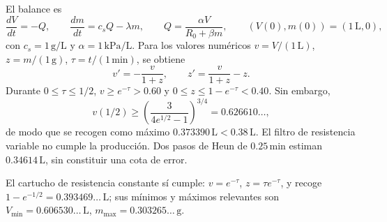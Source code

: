 El balance es
\[
\frac{dV}{dt}=-Q,\qquad \frac{dm}{dt}=c_sQ-\lambda m,
\qquad Q=\frac{\alpha V}{R_0+\beta m},
\qquad (V(0),m(0))=(1\,\mathrm L,0),
\]
con \(c_s=1\,\mathrm{g/L}\) y \(\alpha=1\,\mathrm{kPa/L}\). Para los valores numéricos \(v=V/(1\,\mathrm L)\), \(z=m/(1\,\mathrm g)\), \(\tau=t/(1\,\mathrm{min})\), se obtiene
\[
v'=-\frac{v}{1+z},\qquad z'=\frac{v}{1+z}-z.
\]
Durante \(0\le\tau\le1/2\), \(v\ge e^{-\tau}>0.60\) y \(0\le z\le1-e^{-\tau}<0.40\). Sin embargo,
\[
v(1/2)\ge\left(\frac3{4e^{1/2}-1}\right)^{3/4}
=0.626610\ldots,
\]
de modo que se recogen como máximo \(0.373390\,\mathrm L<0.38\,\mathrm L\). El filtro de resistencia variable no cumple la producción. Dos pasos de Heun de \(0.25\,\mathrm{min}\) estiman \(0.34614\,\mathrm L\), sin constituir una cota de error.

El cartucho de resistencia constante sí cumple: \(v=e^{-\tau}\), \(z=\tau e^{-\tau}\), y recoge \(1-e^{-1/2}=0.393469\ldots\,\mathrm L\); sus mínimos y máximos relevantes son \(V_{\min}=0.606530\ldots\,\mathrm L\), \(m_{\max}=0.303265\ldots\,\mathrm g\).
